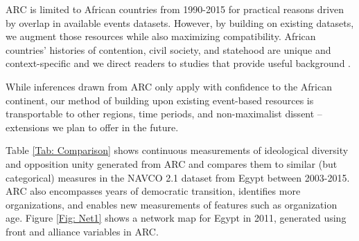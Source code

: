 ARC is limited to African countries from 1990-2015 for practical reasons driven
by overlap in available events datasets. However, by building on existing
datasets, we augment those resources while also maximizing compatibility.
African countries' histories of contention, civil society, and statehood are
unique and context-specific and we direct readers to studies that provide useful
background \citep{Boone2003, Branch2015, Bratton1997, Herbst2014, Mueller2018}. 

While inferences drawn from ARC only apply with confidence to the African
continent, our method of building upon existing event-based resources is
transportable to other regions, time periods, and non-maximalist dissent --
extensions we plan to offer in the future.  


Table \ref{Tab: Comparison} shows continuous measurements of ideological
diversity and opposition unity generated from ARC and compares them to similar
(but categorical) measures in the NAVCO 2.1 dataset \citep{Chenoweth2019a} from
Egypt between 2003-2015. ARC also encompasses years of democratic transition,
identifies more organizations, and enables new measurements of features such as
organization age. Figure \ref{Fig: Net1} shows a network map for Egypt in 2011,
generated using front and alliance variables in ARC.  

\clearpage


